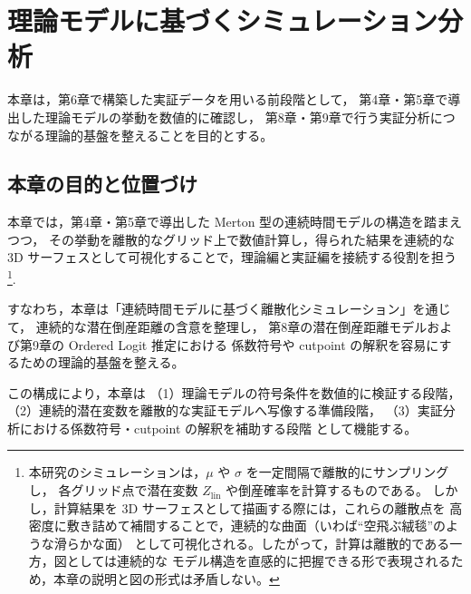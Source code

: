 

\chapter{理論モデルに基づくシミュレーション分析}
\label{chap:simulation}

本章は，第6章で構築した実証データを用いる前段階として，
第4章・第5章で導出した理論モデルの挙動を数値的に確認し，
第8章・第9章で行う実証分析につながる理論的基盤を整えることを目的とする。



\section{本章の目的と位置づけ}

本章では，第4章・第5章で導出した Merton 型の連続時間モデルの構造を踏まえつつ，
その挙動を離散的なグリッド上で数値計算し，得られた結果を連続的な
3D サーフェスとして可視化することで，理論編と実証編を接続する役割を担う\footnote{
本研究のシミュレーションは，$\mu$ や $\sigma$ を一定間隔で離散的にサンプリングし，
各グリッド点で潜在変数 $Z_{\text{lin}}$ や倒産確率を計算するものである。
しかし，計算結果を 3D サーフェスとして描画する際には，これらの離散点を
高密度に敷き詰めて補間することで，連続的な曲面（いわば“空飛ぶ絨毯”のような滑らかな面）
として可視化される。したがって，計算は離散的である一方，図としては連続的な
モデル構造を直感的に把握できる形で表現されるため，本章の説明と図の形式は矛盾しない。
}.

すなわち，本章は「連続時間モデルに基づく離散化シミュレーション」を通じて，
連続的な潜在倒産距離の含意を整理し，
第8章の潜在倒産距離モデルおよび第9章の Ordered Logit 推定における
係数符号や cutpoint の解釈を容易にするための理論的基盤を整える。

この構成により，本章は
（1）理論モデルの符号条件を数値的に検証する段階，
（2）連続的潜在変数を離散的な実証モデルへ写像する準備段階，
（3）実証分析における係数符号・cutpoint の解釈を補助する段階
として機能する。

